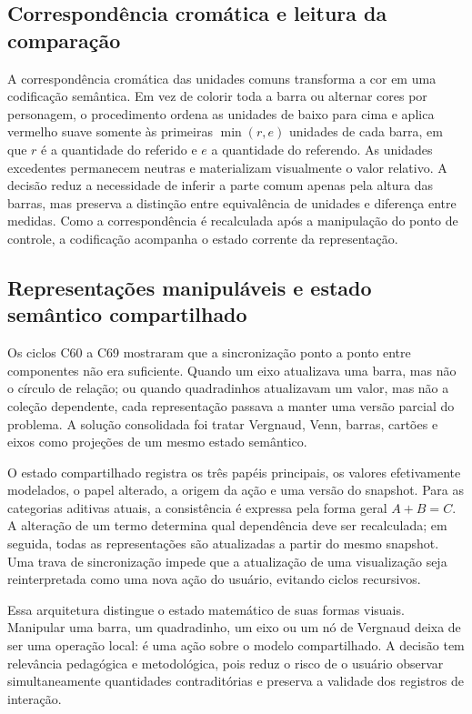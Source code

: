 \documentclass[preprint,12pt,authoryear]{elsarticle}
\begin{document}
\subsection{Correspondência cromática e leitura da comparação}
A correspondência cromática das unidades comuns transforma a cor em uma codificação semântica. Em vez de colorir toda a barra ou alternar cores por personagem, o procedimento ordena as unidades de baixo para cima e aplica vermelho suave somente às primeiras $\min(r,e)$ unidades de cada barra, em que $r$ é a quantidade do referido e $e$ a quantidade do referendo. As unidades excedentes permanecem neutras e materializam visualmente o valor relativo. A decisão reduz a necessidade de inferir a parte comum apenas pela altura das barras, mas preserva a distinção entre equivalência de unidades e diferença entre medidas. Como a correspondência é recalculada após a manipulação do ponto de controle, a codificação acompanha o estado corrente da representação.

\subsection{Representações manipuláveis e estado semântico compartilhado}
Os ciclos C60 a C69 mostraram que a sincronização ponto a ponto entre componentes não era suficiente. Quando um eixo atualizava uma barra, mas não o círculo de relação; ou quando quadradinhos atualizavam um valor, mas não a coleção dependente, cada representação passava a manter uma versão parcial do problema. A solução consolidada foi tratar Vergnaud, Venn, barras, cartões e eixos como projeções de um mesmo estado semântico.

O estado compartilhado registra os três papéis principais, os valores efetivamente modelados, o papel alterado, a origem da ação e uma versão do snapshot. Para as categorias aditivas atuais, a consistência é expressa pela forma geral $A+B=C$. A alteração de um termo determina qual dependência deve ser recalculada; em seguida, todas as representações são atualizadas a partir do mesmo snapshot. Uma trava de sincronização impede que a atualização de uma visualização seja reinterpretada como uma nova ação do usuário, evitando ciclos recursivos.

Essa arquitetura distingue o estado matemático de suas formas visuais. Manipular uma barra, um quadradinho, um eixo ou um nó de Vergnaud deixa de ser uma operação local: é uma ação sobre o modelo compartilhado. A decisão tem relevância pedagógica e metodológica, pois reduz o risco de o usuário observar simultaneamente quantidades contraditórias e preserva a validade dos registros de interação.
\end{document}
